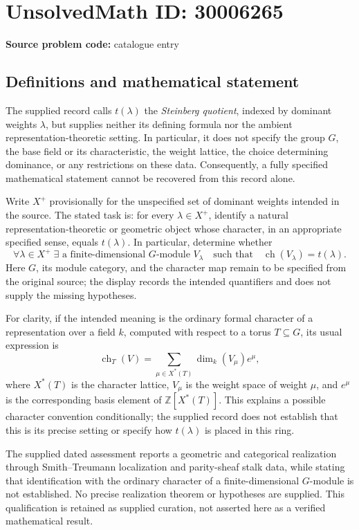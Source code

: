 \documentclass[11pt]{article}
\newcommand{\Z}{\mathbb{Z}}
\begin{document}
\section*{UnsolvedMath ID: 30006265}
\textbf{Source problem code:} catalogue entry
\subsection{Definitions and mathematical statement}
The supplied record calls \(t(\lambda)\) the \emph{Steinberg quotient}, indexed by dominant weights \(\lambda\), but supplies neither its defining formula nor the ambient representation-theoretic setting. In particular, it does not specify the group \(G\), the base field or its characteristic, the weight lattice, the choice determining dominance, or any restrictions on these data. Consequently, a fully specified mathematical statement cannot be recovered from this record alone.

Write \(X^+\) provisionally for the unspecified set of dominant weights intended in the source. The stated task is: for every \(\lambda\in X^+\), identify a natural representation-theoretic or geometric object whose character, in an appropriate specified sense, equals \(t(\lambda)\). In particular, determine whether
\[
\forall\lambda\in X^+\;\exists\text{ a finite-dimensional }G\text{-module }V_\lambda
\quad\text{such that}\quad
\operatorname{ch}(V_\lambda)=t(\lambda).
\]
Here \(G\), its module category, and the character map remain to be specified from the original source; the display records the intended quantifiers and does not supply the missing hypotheses.

For clarity, if the intended meaning is the ordinary formal character of a representation over a field \(k\), computed with respect to a torus \(T\subseteq G\), its usual expression is
\[
\operatorname{ch}_T(V)=\sum_{\mu\in X^*(T)}\dim_k(V_\mu)e^\mu,
\]
where \(X^*(T)\) is the character lattice, \(V_\mu\) is the weight space of weight \(\mu\), and \(e^\mu\) is the corresponding basis element of \(\Z[X^*(T)]\). This explains a possible character convention conditionally; the supplied record does not establish that this is its precise setting or specify how \(t(\lambda)\) is placed in this ring.

The supplied dated assessment reports a geometric and categorical realization through Smith--Treumann localization and parity-sheaf stalk data, while stating that identification with the ordinary character of a finite-dimensional \(G\)-module is not established. No precise realization theorem or hypotheses are supplied. This qualification is retained as supplied curation, not asserted here as a verified mathematical result.
\end{document}

